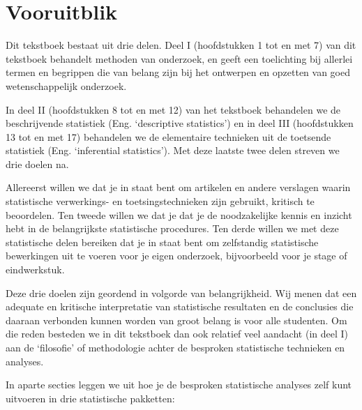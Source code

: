\documentclass[
]{book}
\begin{document}
\hypertarget{sec:vooruitblik}{%
\section{Vooruitblik}\label{sec:vooruitblik}}

Dit tekstboek bestaat uit drie delen. Deel I (hoofdstukken 1 tot en met 7) van dit tekstboek behandelt
methoden van onderzoek, en geeft een toelichting bij allerlei termen en
begrippen die van belang zijn bij het ontwerpen en opzetten van goed
wetenschappelijk onderzoek.

In deel II (hoofdstukken 8 tot en met 12) van het tekstboek behandelen we de beschrijvende statistiek
(Eng. `descriptive statistics') en in deel III (hoofdstukken 13 tot en met 17) behandelen we de
elementaire technieken uit de toetsende statistiek (Eng. `inferential
statistics'). Met deze laatste twee delen streven we drie doelen na.

Allereerst willen we dat je in staat bent om artikelen en andere verslagen waarin
statistische verwerkings- en toetsingstechnieken zijn gebruikt, kritisch
te beoordelen.
Ten tweede willen we dat je dat je de noodzakelijke
kennis en inzicht hebt in de belangrijkste statistische procedures.
Ten derde willen we met deze statistische delen bereiken dat je in staat
bent om zelfstandig statistische bewerkingen uit te voeren voor je eigen
onderzoek, bijvoorbeeld voor je stage of eindwerkstuk.

Deze drie doelen zijn geordend in volgorde van belangrijkheid. Wij menen
dat een adequate en kritische interpretatie van statistische resultaten
en de conclusies die daaraan verbonden kunnen worden van groot belang is
voor alle studenten. Om die reden besteden we in dit tekstboek dan ook
relatief veel aandacht (in deel I) aan de `filosofie' of methodologie achter de besproken statistische technieken en analyses.

In aparte secties leggen we uit hoe je de besproken statistische analyses zelf kunt uitvoeren in drie statistische pakketten:
\end{document}
